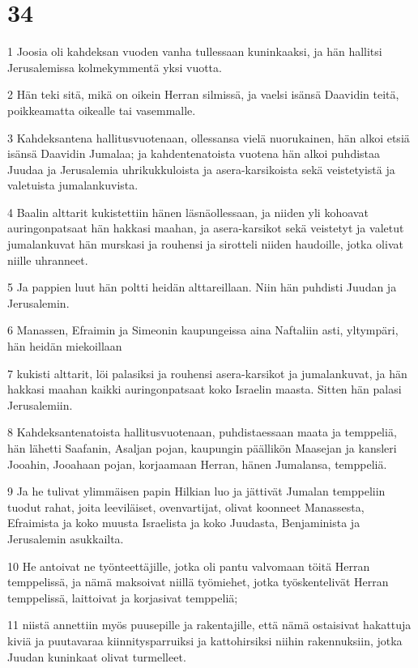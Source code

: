 \chapter{34}

\par 1 Joosia oli kahdeksan vuoden vanha tullessaan kuninkaaksi, ja hän hallitsi Jerusalemissa kolmekymmentä yksi vuotta.
\par 2 Hän teki sitä, mikä on oikein Herran silmissä, ja vaelsi isänsä Daavidin teitä, poikkeamatta oikealle tai vasemmalle.
\par 3 Kahdeksantena hallitusvuotenaan, ollessansa vielä nuorukainen, hän alkoi etsiä isänsä Daavidin Jumalaa; ja kahdentenatoista vuotena hän alkoi puhdistaa Juudaa ja Jerusalemia uhrikukkuloista ja asera-karsikoista sekä veistetyistä ja valetuista jumalankuvista.
\par 4 Baalin alttarit kukistettiin hänen läsnäollessaan, ja niiden yli kohoavat auringonpatsaat hän hakkasi maahan, ja asera-karsikot sekä veistetyt ja valetut jumalankuvat hän murskasi ja rouhensi ja sirotteli niiden haudoille, jotka olivat niille uhranneet.
\par 5 Ja pappien luut hän poltti heidän alttareillaan. Niin hän puhdisti Juudan ja Jerusalemin.
\par 6 Manassen, Efraimin ja Simeonin kaupungeissa aina Naftaliin asti, yltympäri, hän heidän miekoillaan
\par 7 kukisti alttarit, löi palasiksi ja rouhensi asera-karsikot ja jumalankuvat, ja hän hakkasi maahan kaikki auringonpatsaat koko Israelin maasta. Sitten hän palasi Jerusalemiin.
\par 8 Kahdeksantenatoista hallitusvuotenaan, puhdistaessaan maata ja temppeliä, hän lähetti Saafanin, Asaljan pojan, kaupungin päällikön Maasejan ja kansleri Jooahin, Jooahaan pojan, korjaamaan Herran, hänen Jumalansa, temppeliä.
\par 9 Ja he tulivat ylimmäisen papin Hilkian luo ja jättivät Jumalan temppeliin tuodut rahat, joita leeviläiset, ovenvartijat, olivat koonneet Manassesta, Efraimista ja koko muusta Israelista ja koko Juudasta, Benjaminista ja Jerusalemin asukkailta.
\par 10 He antoivat ne työnteettäjille, jotka oli pantu valvomaan töitä Herran temppelissä, ja nämä maksoivat niillä työmiehet, jotka työskentelivät Herran temppelissä, laittoivat ja korjasivat temppeliä;
\par 11 niistä annettiin myös puusepille ja rakentajille, että nämä ostaisivat hakattuja kiviä ja puutavaraa kiinnitysparruiksi ja kattohirsiksi niihin rakennuksiin, jotka Juudan kuninkaat olivat turmelleet.

